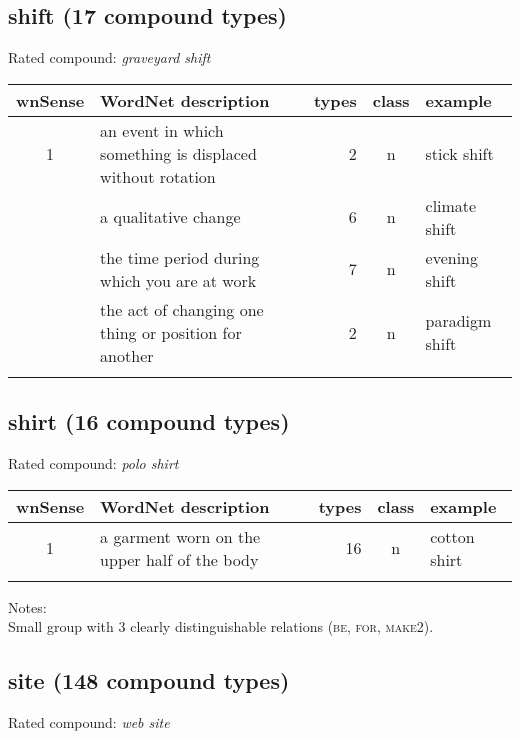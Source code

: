 \subsection{shift     (17 compound types)}
Rated compound: \emph{graveyard shift}

\vspace*{1ex}

\noindent
\begin{longtable}{c>{\raggedright\arraybackslash}p{5cm}rc>{\raggedright\arraybackslash}p{2cm}}\lsptoprule
{\small wnSense}&WordNet description&types&class&example\\\midrule
1&an event in which something is displaced without rotation&2&n&stick shift\\\tablevspace
2&a qualitative change&6&n&climate shift\\\tablevspace
3&the time period during which you are at work&7&n&evening shift\\\tablevspace
4&the act of changing one thing or position for another&2&n&paradigm shift\\\lspbottomrule
\end{longtable}
\subsection{shirt     (16 compound types)}
Rated compound: \emph{polo shirt}

\vspace*{1ex}

\noindent
\begin{longtable}{c>{\raggedright\arraybackslash}p{5cm}rc>{\raggedright\arraybackslash}p{2cm}}\lsptoprule
{\small wnSense}&WordNet description&types&class&example\\\midrule
1&a garment worn on the upper half of the body&16&n&cotton shirt\\\lspbottomrule
\end{longtable}

\noindent
Notes:\\
Small group with 3 clearly distinguishable relations (\textsc{be}, \textsc{for}, \textsc{make2}).
\pagebreak[4]

\subsection{site      (148 compound types)}
Rated compound: \emph{web site}

\vspace*{-.2cm}

